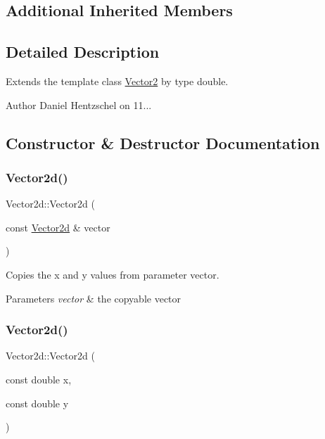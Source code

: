\subsection*{Additional Inherited Members}


\subsection{Detailed Description}
Extends the template class \mbox{\hyperlink{class_vector2}{Vector2}} by type double. 

\begin{DoxyAuthor}{Author}
Daniel Hentzschel on 11... 
\end{DoxyAuthor}


\subsection{Constructor \& Destructor Documentation}
\mbox{\label{class_vector2d_aba5e7f4b80cfbd84005946a5b2b1b6ab}} 
\subsubsection{\texorpdfstring{Vector2d()}{Vector2d()}\hspace{0.1cm}{\footnotesize\ttfamily [1/2]}}
{\footnotesize\ttfamily Vector2d\+::\+Vector2d (\begin{DoxyParamCaption}\item[{const \mbox{\hyperlink{class_vector2d}{Vector2d}} \&}]{vector }\end{DoxyParamCaption})\hspace{0.3cm}{\ttfamily [inline]}}



Copies the x and y values from parameter vector. 


\begin{DoxyParams}{Parameters}
{\em vector} & the copyable vector \\
\hline
\end{DoxyParams}
\mbox{\label{class_vector2d_aa7456828fba87c279a117ee4d8745329}} 
\subsubsection{\texorpdfstring{Vector2d()}{Vector2d()}\hspace{0.1cm}{\footnotesize\ttfamily [2/2]}}
{\footnotesize\ttfamily Vector2d\+::\+Vector2d (\begin{DoxyParamCaption}\item[{const double}]{x,  }\item[{const double}]{y }\end{DoxyParamCaption})\hspace{0.3cm}{\ttfamily [inline]}}



